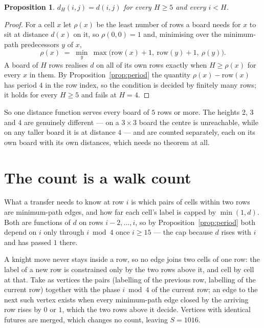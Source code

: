 \documentclass[11pt,a4paper]{article}
\theoremstyle{plain}
\newtheorem{proposition}[theorem]{Proposition}
\theoremstyle{definition}
\begin{document}
\begin{proposition}\label{prop:height}
$d_H(i,j)=d(i,j)$ for every $H\ge5$ and every $i<H$.
\end{proposition}

\begin{proof}
For a cell $x$ let $\rho(x)$ be the least number of rows a board needs for $x$ to sit at distance $d(x)$ on it, so $\rho(0,0)=1$ and, minimising over the minimum-path predecessors $y$ of $x$,
\[ \rho(x)\;=\;\min_y\ \max\bigl(\mathrm{row}(x)+1,\ \mathrm{row}(y)+1,\ \rho(y)\bigr). \]
A board of $H$ rows realises $d$ on all of its own rows exactly when $H\ge\rho(x)$ for every $x$ in them. By Proposition~\ref{prop:period} the quantity $\rho(x)-\mathrm{row}(x)$ has period $4$ in the row index, so the condition is decided by finitely many rows; it holds for every $H\ge5$ and fails at $H=4$.
\end{proof}

So one distance function serves every board of $5$ rows or more. The heights 2, 3 and 4 are genuinely different --- on a $3\times3$ board the centre is unreachable, while on any taller board it is at distance $4$ --- and are counted separately, each on its own board with its own distances, which needs no theorem at all.

\section{The count is a walk count}

What a transfer needs to know at row $i$ is which pairs of cells within two rows are minimum-path edges, and how far each cell's label is capped by $\min(1,d)$. Both are functions of $d$ on rows $i-2,\dots,i$, so by Proposition~\ref{prop:period} both depend on $i$ only through $i\bmod 4$ once $i\ge15$ --- the cap because $d$ rises with $i$ and has passed $1$ there.

A knight move never stays inside a row, so no edge joins two cells of one row: the label of a new row is constrained only by the two rows above it, and cell by cell at that. Take as vertices the pairs (labelling of the previous row, labelling of the current row) together with the phase $i\bmod 4$ of the current row; an edge to the next such vertex exists when every minimum-path edge closed by the arriving row rises by $0$ or $1$, which the two rows above it decide. Vertices with identical futures are merged, which changes no count, leaving $S=1016$.
\end{document}
